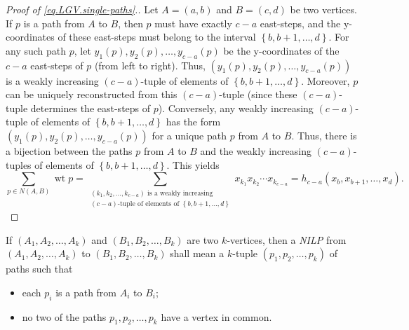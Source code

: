 \documentclass[reqno]{amsart}
\newcommand{\0}{\phantom{c}}
\let\sumnonlimits\sum
\renewcommand{\sum}{\sumnonlimits\limits}
\newcommand{\defn}[1]{{\color{darkred}\emph{#1}}} %
\theoremstyle{plain}
\theoremstyle{definition}
\numberwithin{equation}{section}
\begin{document}
\begin{proof}
[Proof of \eqref{eq.LGV.single-paths}.]Let $A=\left(  a,b\right)  $ and
$B=\left(  c,d\right)  $ be two vertices. If $p$ is a path from $A$ to $B$,
then $p$ must have exactly $c-a$ east-steps, and the y-coordinates of these
east-steps must belong to the interval $\left\{  b,b+1,\ldots,d\right\}  $.
For any such path $p$, let $y_{1}\left(  p\right)  ,y_{2}\left(  p\right)
,\ldots,y_{c-a}\left(  p\right)  $ be the y-coordinates of the $c-a$
east-steps of $p$ (from left to right). Thus, $\left(  y_{1}\left(  p\right)
,y_{2}\left(  p\right)  ,\ldots,y_{c-a}\left(  p\right)  \right)  $ is a
weakly increasing $\left(  c-a\right)  $-tuple of elements of $\left\{
b,b+1,\ldots,d\right\}  $. Moreover, $p$ can be uniquely reconstructed from
this $\left(  c-a\right)  $-tuple (since these $\left(  c-a\right)  $-tuple
determines the east-steps of $p$). Conversely, any weakly increasing $\left(
c-a\right)  $-tuple of elements of $\left\{  b,b+1,\ldots,d\right\}  $ has the
form $\left(  y_{1}\left(  p\right)  ,y_{2}\left(  p\right)  ,\ldots
,y_{c-a}\left(  p\right)  \right)  $ for a unique path $p$ from $A$ to $B$.
Thus, there is a bijection between the paths $p$ from $A$ to $B$ and the
weakly increasing $\left(  c-a\right)  $-tuples of elements of $\left\{
b,b+1,\ldots,d\right\}  $. This yields
\[
\sum_{p\in N\left(  A,B\right)  }\operatorname*{wt}p=\sum_{\substack{\left(
k_{1},k_{2},\ldots,k_{c-a}\right)  \text{ is a weakly increasing}\\\left(
c-a\right)  \text{-tuple of elements of }\left\{  b,b+1,\ldots,d\right\}
}}x_{k_{1}}x_{k_{2}}\cdots x_{k_{c-a}}=h_{c-a}\left(  x_{b},x_{b+1}%
,\ldots,x_{d}\right)  .
\]

\end{proof}

If $\left(  A_{1},A_{2},\ldots,A_{k}\right)  $ and $\left(  B_{1},B_{2}%
,\ldots,B_{k}\right)  $ are two $k$-vertices, then a \defn{NILP} from $\left(
A_{1},A_{2},\ldots,A_{k}\right)  $ to $\left(  B_{1},B_{2},\ldots
,B_{k}\right)  $ shall mean a $k$-tuple $\left(  p_{1},p_{2},\ldots
,p_{k}\right)  $ of paths such that

\begin{itemize}
\item each $p_{i}$ is a path from $A_{i}$ to $B_{i}$;

\item no two of the paths $p_{1},p_{2},\ldots,p_{k}$ have a vertex in common.
\end{itemize}
\end{document}
